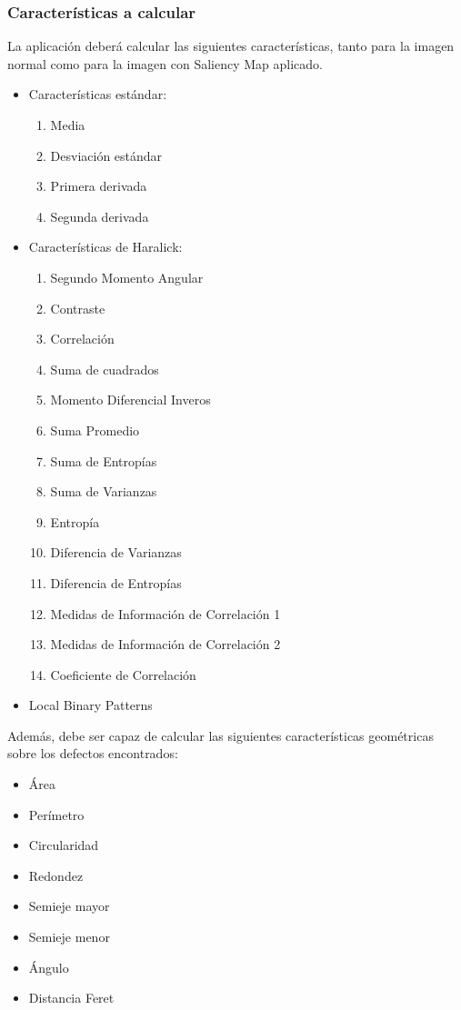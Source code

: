 \subsubsection{Características a calcular}
La aplicación deberá calcular las siguientes características, tanto para la imagen normal como para la imagen con Saliency Map aplicado.
\begin{itemize}
 \item Características estándar: 
 \begin{enumerate}
 \item Media
 \item Desviación estándar
 \item Primera derivada
 \item Segunda derivada
 \end{enumerate}
 \item Características de Haralick:
 \begin{enumerate}
 \item Segundo Momento Angular
 \item Contraste
 \item Correlación
 \item Suma de cuadrados
 \item Momento Diferencial Inveros
 \item Suma Promedio
 \item Suma de Entropías
 \item Suma de Varianzas
 \item Entropía
 \item Diferencia de Varianzas
 \item Diferencia de Entropías
 \item Medidas de Información de Correlación 1
 \item Medidas de Información de Correlación 2
 \item Coeficiente de Correlación
 \end{enumerate}
 \item Local Binary Patterns
\end{itemize}

Además, debe ser capaz de calcular las siguientes características geométricas sobre los defectos encontrados:
\begin{itemize}
\item Área
\item Perímetro
\item Circularidad
\item Redondez
\item Semieje mayor
\item Semieje menor
\item Ángulo
\item Distancia Feret
\end{itemize}



